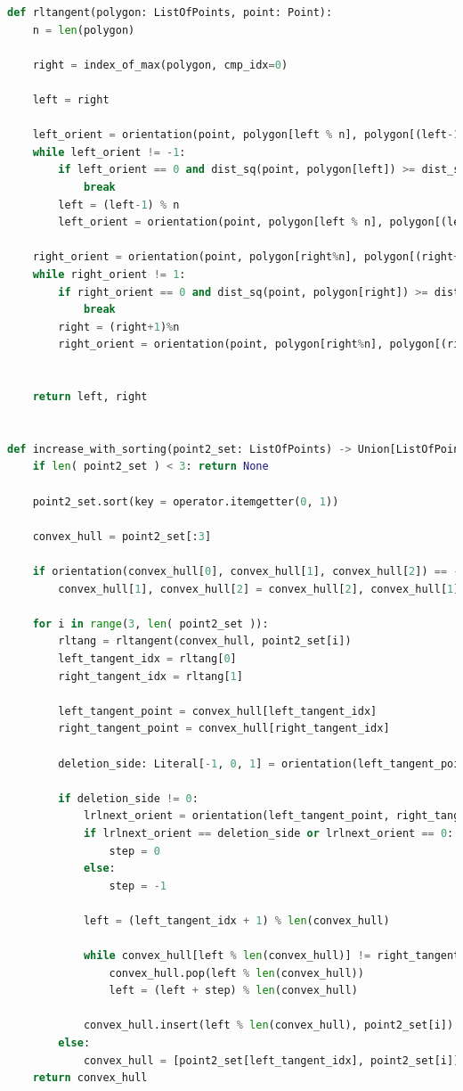 \documentclass[11pt]{article}
\theoremstyle{remark} \newtheorem{definition}{def.}
\theoremstyle{definition} \newtheorem{twierdzenie}{tw.}
\begin{document}
\begin{lstlisting}[language=Python]
def rltangent(polygon: ListOfPoints, point: Point):
    n = len(polygon)
    
    right = index_of_max(polygon, cmp_idx=0)
    
    left = right
    
    left_orient = orientation(point, polygon[left % n], polygon[(left-1)%n])  
    while left_orient != -1:
        if left_orient == 0 and dist_sq(point, polygon[left]) >= dist_sq(point, polygon[(left-1)%n]):
            break
        left = (left-1) % n
        left_orient = orientation(point, polygon[left % n], polygon[(left-1)%n]) 
        
    right_orient = orientation(point, polygon[right%n], polygon[(right+1)%n]) 
    while right_orient != 1:
        if right_orient == 0 and dist_sq(point, polygon[right]) >= dist_sq(point, polygon[(right+1)%n]):
            break
        right = (right+1)%n
        right_orient = orientation(point, polygon[right%n], polygon[(right+1)%n]) 
        
        
    return left, right

    
def increase_with_sorting(point2_set: ListOfPoints) -> Union[ListOfPoints, None]:
    if len( point2_set ) < 3: return None
    
    point2_set.sort(key = operator.itemgetter(0, 1))
    
    convex_hull = point2_set[:3]

    if orientation(convex_hull[0], convex_hull[1], convex_hull[2]) == -1:
        convex_hull[1], convex_hull[2] = convex_hull[2], convex_hull[1]
    
    for i in range(3, len( point2_set )):
        rltang = rltangent(convex_hull, point2_set[i])
        left_tangent_idx = rltang[0]
        right_tangent_idx = rltang[1]

        left_tangent_point = convex_hull[left_tangent_idx]
        right_tangent_point = convex_hull[right_tangent_idx]        

        deletion_side: Literal[-1, 0, 1] = orientation(left_tangent_point, right_tangent_point, point2_set[i])

        if deletion_side != 0:
            lrlnext_orient = orientation(left_tangent_point, right_tangent_point, convex_hull[(left_tangent_idx + 1) % len(convex_hull)])
            if lrlnext_orient == deletion_side or lrlnext_orient == 0:
                step = 0
            else: 
                step = -1
                
            left = (left_tangent_idx + 1) % len(convex_hull)
            
            while convex_hull[left % len(convex_hull)] != right_tangent_point:
                convex_hull.pop(left % len(convex_hull))
                left = (left + step) % len(convex_hull)
                
            convex_hull.insert(left % len(convex_hull), point2_set[i])
        else:
            convex_hull = [point2_set[left_tangent_idx], point2_set[i]]
    return convex_hull
\end{lstlisting}
\end{document}
